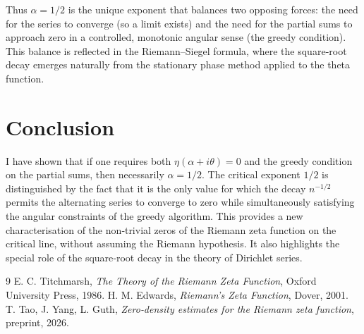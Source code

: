 \documentclass[12pt,a4paper]{article}
\begin{document}
Thus $\alpha=1/2$ is the unique exponent that balances two opposing forces: the need for the series to converge (so a limit exists) and the need for the partial sums to approach zero in a controlled, monotonic angular sense (the greedy condition). This balance is reflected in the Riemann–Siegel formula, where the square‑root decay emerges naturally from the stationary phase method applied to the theta function.

\section{Conclusion}

I have shown that if one requires both $\eta(\alpha+i\theta)=0$ and the greedy condition on the partial sums, then necessarily $\alpha=1/2$. The critical exponent $1/2$ is distinguished by the fact that it is the only value for which the decay $n^{-1/2}$ permits the alternating series to converge to zero while simultaneously satisfying the angular constraints of the greedy algorithm. This provides a new characterisation of the non‑trivial zeros of the Riemann zeta function on the critical line, without assuming the Riemann hypothesis. It also highlights the special role of the square‑root decay in the theory of Dirichlet series.

\begin{thebibliography}{9}
 E. C. Titchmarsh, \textit{The Theory of the Riemann Zeta Function}, Oxford University Press, 1986.
 H. M. Edwards, \textit{Riemann's Zeta Function}, Dover, 2001.
 T. Tao, J. Yang, L. Guth, \textit{Zero‑density estimates for the Riemann zeta function}, preprint, 2026.
\end{thebibliography}
\end{document}
